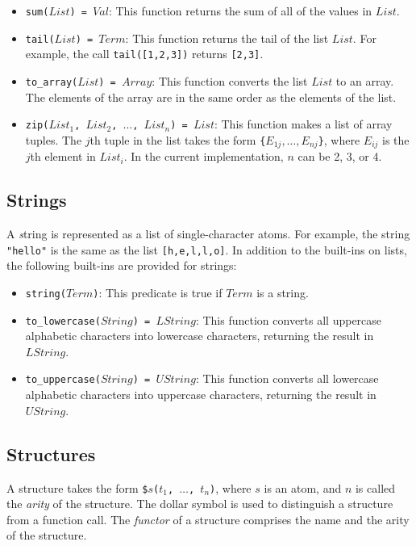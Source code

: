 \begin{itemize}
\item \texttt{sum($List$) = $Val$}: This function returns the sum of all of the values in $List$. 
\item \texttt{tail($List$) = $Term$}: This function returns the tail of the list $List$.  For example, the call \texttt{tail([1,2,3])} returns \texttt{[2,3]}.
\item \texttt{to\_array($List$) = $Array$}: This function converts the list $List$ to an array.  The elements of the array are in the same order as the elements of the list.
\item \texttt{zip($List_1$, $List_2$, $\ldots$, $List_n$) = $List$}: This function makes a list of array tuples.  The $j$th tuple in the list takes the form \texttt{\{$E_{1j},\ldots,E_{nj}$\}}, where $E_{ij}$ is the $j$th element in $List_i$. In the current implementation, $n$ can be 2, 3, or 4.

\end{itemize}

\subsection{\label{subsec:strings}Strings}
A {\emph string} is represented as a list of single-character atoms. For example, the string \texttt{"hello"} is the same as the list \texttt{[h,e,l,l,o]}. In addition to the built-ins on lists, the following built-ins are provided for strings:
\begin{itemize}
\item \texttt{string($Term$)}: This predicate is true if $Term$ is a string. 
\item \texttt{to\_lowercase($String$) = $LString$}: This function converts all uppercase alphabetic characters into lowercase characters, returning the result in $LString$.
\item \texttt{to\_uppercase($String$) = $UString$}: This function converts all lowercase alphabetic characters into uppercase characters, returning the result in $UString$.
\end{itemize}

\subsection{Structures}
A structure takes the form \texttt{\$$s$($t_1$, $\ldots$, $t_{n}$)}, where $s$ is an atom, and $n$ is called the \emph{arity} of the structure. The dollar symbol is used to distinguish a structure from a function call. The \emph{functor} of a structure comprises the name and the arity of the structure. 

